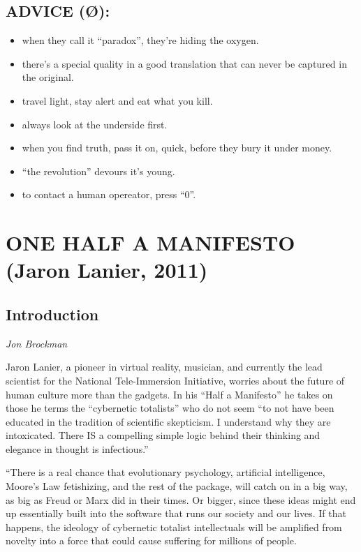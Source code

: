 \documentclass[letterpaper,12pt,english]{sphinxmanual}
\begin{document}
\section{ADVICE (Ø):}
\label{2011:advice-o}\begin{itemize}
\item {} 
when they call it ``paradox'', they're hiding the oxygen.

\item {} 
there's a special quality in a good translation that can never be captured in the original.

\item {} 
travel light, stay alert and eat what you kill.

\item {} 
always look at the underside first.

\item {} 
when you find truth, pass it on, quick, before they bury it under money.

\item {} 
``the revolution'' devours it's young.

\item {} 
to contact a human opereator, press ``0''.

\end{itemize}


\chapter{ONE HALF A MANIFESTO (Jaron Lanier, 2011)}
\label{lanier::doc}\label{lanier:one-half-a-manifesto-jaron-lanier-2011}

\section{Introduction}
\label{lanier:introduction}
\emph{Jon Brockman}

Jaron Lanier, a pioneer in virtual reality, musician, and currently the lead scientist for the National Tele-Immersion Initiative, worries about the future of human culture more than the gadgets. In his ``Half a Manifesto'' he takes on those he terms the ``cybernetic totalists'' who do not seem ``to not have been educated in the tradition of scientific skepticism. I understand why they are intoxicated. There IS a compelling simple logic behind their thinking and elegance in thought is infectious.''

``There is a real chance that evolutionary psychology, artificial intelligence, Moore's Law fetishizing, and the rest of the package, will catch on in a big way, as big as Freud or Marx did in their times. Or bigger, since these ideas might end up essentially built into the software that runs our society and our lives. If that happens, the ideology of cybernetic totalist intellectuals will be amplified from novelty into a force that could cause suffering for millions of people.
\end{document}
